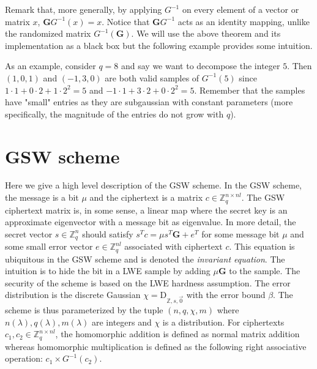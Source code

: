 Remark that, more generally, by applying $G^{-1}$ on every element of a vector or matrix $x$, $\mathbf{G}G^{-1}(x) = x$. Notice that $\mathbf{G}G^{-1}$ acts as an identity mapping, unlike the randomized matrix $G^{-1}(\mathbf{G})$. We will use the above theorem and its implementation as a black box but the following example provides some intuition.  

As an example, consider $q = 8$ and say we want to decompose the integer $5$. Then $(1,0,1)$ and $(-1,3,0)$ are both valid samples of $G^{-1}(5)$ since $1 \cdot 1 + 0\cdot 2 + 1\cdot 2^2 = 5$ and $-1 \cdot 1 + 3 \cdot 2 + 0\cdot 2^2 = 5$. Remember that the samples have "small" entries as they are subgaussian with constant parameters (more specifically, the magnitude of the entries do not grow with $q$).

\section{GSW scheme}
Here we give a high level description of the GSW scheme. In the GSW scheme, the message is a bit $\mu$ and the ciphertext is a matrix $c \in \mathbb{Z}_q^{n \times nl}$. The GSW ciphertext matrix is, in some sense, a linear map where the secret key is an approximate eigenvector with a message bit as eigenvalue. In more detail, the secret vector $s \in \mathbb{Z}_q^n$ should satisfy $s^T c = \mu s^T\mathbf{G} + e^T$ for some message bit $\mu$ and some small error vector $e \in \mathbb{Z}_q^{nl}$ associated with ciphertext $c$. This equation is ubiquitous in the GSW scheme and is denoted the \textit{invariant equation}. The intuition is to hide the bit in a LWE sample by adding $\mu \mathbf{G}$ to the sample. The security of the scheme is based on the LWE hardness assumption. The error distribution is the discrete Gaussian $\chi = \textrm{D}_{\mathbb{Z}, s, \vec{0}}$ with the error bound $\beta$. The scheme is thus parameterized by the tuple $(n, q, \chi, m)$ where $n(\lambda), q(\lambda), m(\lambda)$ are integers and $\chi$ is a distribution. 
For ciphertexts $c_1, c_2 \in \mathbb{Z}_q^{n \times nl}$, the homomorphic addition is defined as normal matrix addition whereas homomorphic multiplication is defined as the following right associative operation: $c_1 \times G^{-1}(c_2)$.

